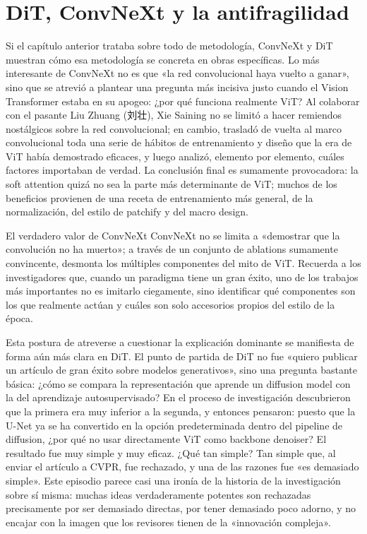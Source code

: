 \section{DiT, ConvNeXt y la antifragilidad}

Si el capítulo anterior trataba sobre todo de metodología, ConvNeXt y DiT muestran cómo esa metodología se concreta en obras específicas. Lo más interesante de ConvNeXt no es que «la red convolucional haya vuelto a ganar», sino que se atrevió a plantear una pregunta más incisiva justo cuando el Vision Transformer estaba en su apogeo: ¿por qué funciona realmente ViT? Al colaborar con el pasante Liu Zhuang (刘壮), Xie Saining no se limitó a hacer remiendos nostálgicos sobre la red convolucional; en cambio, trasladó de vuelta al marco convolucional toda una serie de hábitos de entrenamiento y diseño que la era de ViT había demostrado eficaces, y luego analizó, elemento por elemento, cuáles factores importaban de verdad. La conclusión final es sumamente provocadora: la soft attention quizá no sea la parte más determinante de ViT; muchos de los beneficios provienen de una receta de entrenamiento más general, de la normalización, del estilo de patchify y del macro design.

\begin{knowledgebox}{El verdadero valor de ConvNeXt}
ConvNeXt no se limita a «demostrar que la convolución no ha muerto»; a través de un conjunto de ablations sumamente convincente, desmonta los múltiples componentes del mito de ViT. Recuerda a los investigadores que, cuando un paradigma tiene un gran éxito, uno de los trabajos más importantes no es imitarlo ciegamente, sino identificar qué componentes son los que realmente actúan y cuáles son solo accesorios propios del estilo de la época.
\end{knowledgebox}

Esta postura de atreverse a cuestionar la explicación dominante se manifiesta de forma aún más clara en DiT. El punto de partida de DiT no fue «quiero publicar un artículo de gran éxito sobre modelos generativos», sino una pregunta bastante básica: ¿cómo se compara la representación que aprende un diffusion model con la del aprendizaje autosupervisado? En el proceso de investigación descubrieron que la primera era muy inferior a la segunda, y entonces pensaron: puesto que la U-Net ya se ha convertido en la opción predeterminada dentro del pipeline de diffusion, ¿por qué no usar directamente ViT como backbone denoiser? El resultado fue muy simple y muy eficaz. ¿Qué tan simple? Tan simple que, al enviar el artículo a CVPR, fue rechazado, y una de las razones fue «es demasiado simple». Este episodio parece casi una ironía de la historia de la investigación sobre sí misma: muchas ideas verdaderamente potentes son rechazadas precisamente por ser demasiado directas, por tener demasiado poco adorno, y no encajar con la imagen que los revisores tienen de la «innovación compleja».

